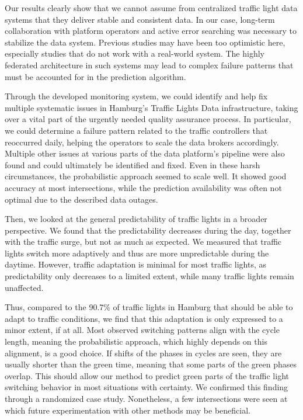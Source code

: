 \begin{Summary}
Our results clearly show that we cannot assume from centralized traffic light data systems that they deliver stable and consistent data. In our case, long-term collaboration with platform operators and active error searching was necessary to stabilize the data system. Previous studies may have been too optimistic here, especially studies that do not work with a real-world system. The highly federated architecture in such systems may lead to complex failure patterns that must be accounted for in the prediction algorithm. 

Through the developed monitoring system, we could identify and help fix multiple systematic issues in Hamburg’s Traffic Lights Data infrastructure, taking over a vital part of the urgently needed quality assurance process. In particular, we could determine a failure pattern related to the traffic controllers that reoccurred daily, helping the operators to scale the data brokers accordingly. Multiple other issues at various parts of the data platform's pipeline were also found and could ultimately be identified and fixed. Even in these harsh circumstances, the probabilistic approach seemed to scale well. It showed good accuracy at most intersections, while the prediction availability was often not optimal due to the described data outages.

Then, we looked at the general predictability of traffic lights in a broader perspective. We found that the predictability decreases during the day, together with the traffic surge, but not as much as expected. We measured that traffic lights switch more adaptively and thus are more unpredictable during the daytime. However, traffic adaptation is minimal for most traffic lights, as predictability only decreases to a limited extent, while many traffic lights remain unaffected. 

Thus, compared to the 90.7\% of traffic lights in Hamburg that should be able to adapt to traffic conditions, we find that this adaptation is only expressed to a minor extent, if at all. Most observed switching patterns align with the cycle length, meaning the probabilistic approach, which highly depends on this alignment, is a good choice. If shifts of the phases in cycles are seen, they are usually shorter than the green time, meaning that some parts of the green phases overlap. This should allow our method to predict green parts of the traffic light switching behavior in most situations with certainty. We confirmed this finding through a randomized case study. Nonetheless, a few intersections were seen at which future experimentation with other methods may be beneficial.
\end{Summary}

